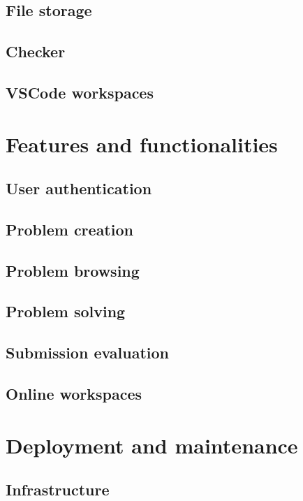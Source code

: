 \documentclass[12pt,a4paper]{report}
\begin{document}
\section{File storage}

\section{Checker}

\section{VSCode workspaces}



\chapter{Features and functionalities}
\section{User authentication}

\section{Problem creation}

\section{Problem browsing}

\section{Problem solving}

\section{Submission evaluation}

\section{Online workspaces}



\chapter{Deployment and maintenance}
\section{Infrastructure}
\end{document}
